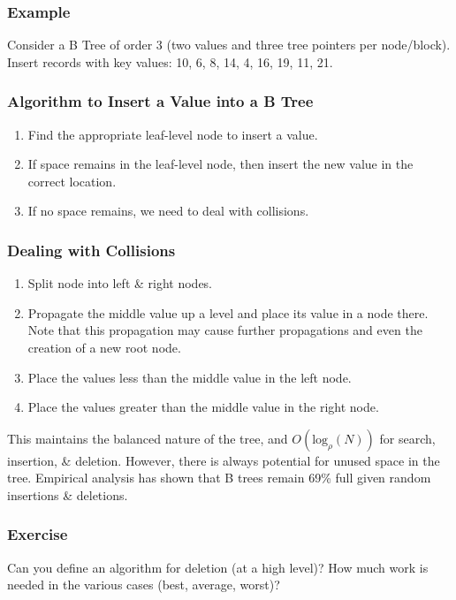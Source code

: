 \documentclass[a4paper,11pt]{article}
\begin{document}
\subsubsection{Example}
Consider a B Tree of order 3 (two values and three tree pointers per node/block).
Insert records with key values: 10, 6, 8, 14, 4, 16, 19, 11, 21.

\subsubsection{Algorithm to Insert a Value into a B Tree}
\begin{enumerate}
    \item   Find the appropriate leaf-level node to insert a value.
    \item   If space remains in the leaf-level node, then insert the new value in the correct location.
    \item   If no space remains, we need to deal with collisions.
\end{enumerate}

\subsubsection{Dealing with Collisions}
\begin{enumerate}
    \item   Split node into left \& right nodes.
    \item   Propagate the middle value up a level and place its value in a node there. Note that this propagation may 
            cause further propagations and even the creation of a new root node.
    \item   Place the values less than the middle value in the left node.
    \item   Place the values greater than the middle value in the right node.
\end{enumerate}

This maintains the balanced nature of the tree, and $O(\text{log}_\rho(N))$ for search, insertion, \& deletion.
However, there is always potential for unused space in the tree. 
Empirical analysis has shown that B trees remain 69\% full given random insertions \& deletions.

\subsubsection{Exercise}
Can you define an algorithm for deletion (at a high level)?
How much work is needed in the various cases (best, average, worst)?
\end{document}
